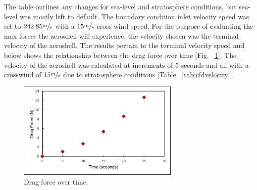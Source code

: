 \begin{table}[H]
\caption{\label{tab:cfdprojectschematic}CFD sea-level and stratosphere parameter differences.}
\centering
{}
\end{table}

\indent\indent The table outlines any changes for sea-level and stratosphere conditions, but sea-level was mostly left to default. The boundary condition inlet velocity speed was set to $242.85 \sfrac{m}{s}$ with a $15 \sfrac{m}{s}$ cross wind speed. For the purpose of evaluating the max forces the aeroshell will experience, the velocity chosen was the terminal velocity of the aeroshell. The results pertain to the terminal velocity speed and below shows the relationship between the drag force over time [Fig. ~\ref{fig:dragforce}]. The velocity of the aeroshell was calculated at increments of 5 seconds and all with a crosswind of $15 \sfrac{m}{s}$ due to stratosphere conditions [Table ~\ref{tab:cfdvelocity}].

\begin{figure}[H]
  \centering
  \includegraphics[width=0.7\textwidth]{Aeroshell/drag_relation.png}
  \caption{\label{fig:dragforce}Drag force over time.}
\end{figure}

